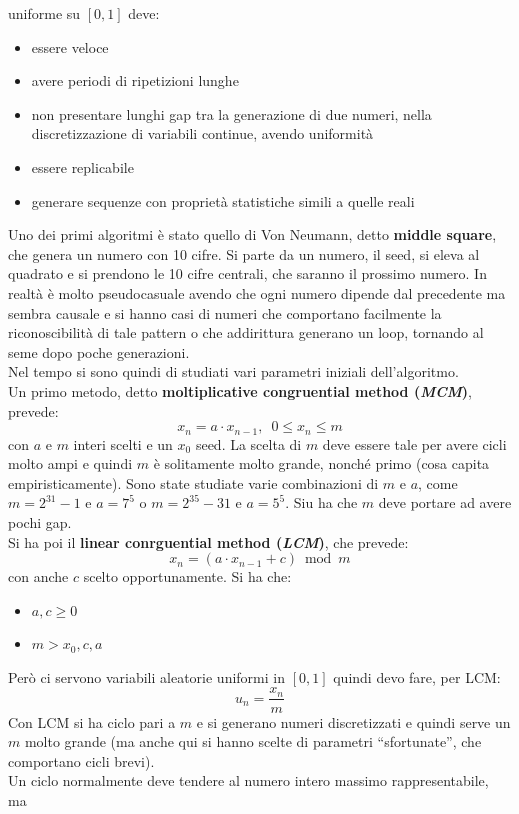 \documentclass[a4paper,12pt, oneside]{book}
\begin{document}
uniforme su $[0,1]$ deve:
\begin{itemize}
  \item essere veloce
  \item avere periodi di ripetizioni lunghe
  \item non presentare lunghi gap tra la generazione di due numeri, nella
  discretizzazione di variabili continue, avendo uniformità
  \item essere replicabile
 \item generare sequenze con proprietà statistiche simili a quelle reali
\end{itemize}
Uno dei primi algoritmi è stato quello di Von Neumann, detto \textbf{middle
  square}, che genera un numero con 10 cifre. Si parte da un numero, il seed, si
eleva al 
quadrato e si prendono le 10 cifre centrali, che saranno il prossimo numero. In
realtà è molto pseudocasuale avendo che ogni numero dipende dal precedente ma
sembra causale e si hanno casi di numeri che comportano facilmente la
riconoscibilità di tale pattern o che addirittura generano un loop, tornando al
seme dopo poche generazioni.  \\
Nel tempo si sono quindi di studiati vari parametri iniziali dell'algoritmo. \\
Un primo metodo, detto \textbf{moltiplicative congruential method
  (\textit{MCM})}, prevede: 
\[x_n=a\cdot x_{n-1},\,\,\,0\leq x_n\leq m\]
con $a$ e $m$ interi scelti e un $x_0$ seed. La scelta di $m$ deve essere tale
per avere cicli molto ampi e quindi $m$ è solitamente molto grande, nonché primo
(cosa capita empiristicamente). Sono state studiate varie combinazioni di $m$ e
$a$, come $m=2^{31}-1$ e $a=7^5$ o $m=2^{35}-31$ e $a=5^5$. Siu ha che $m$ deve
portare ad avere pochi gap.\\
Si ha poi il \textbf{linear conrguential method (\textit{LCM})}, che prevede:
\[x_n=(a\cdot x_{n-1}+c)\bmod m\]
con anche $c$ scelto opportunamente. Si ha che:
\begin{itemize}
  \item $a,c\geq 0$
  \item $m>x_0,c,a$
\end{itemize}
Però ci servono variabili aleatorie uniformi in $[0,1]$ quindi devo fare, per
LCM: 
\[u_n=\frac{x_n}{m}\]
Con LCM si ha ciclo pari a $m$ e si generano numeri discretizzati e quindi serve
un $m$ molto grande (ma anche qui si hanno scelte di parametri ``sfortunate'',
che comportano cicli brevi).\\
Un ciclo normalmente deve tendere al numero intero massimo rappresentabile, ma
\end{document}
